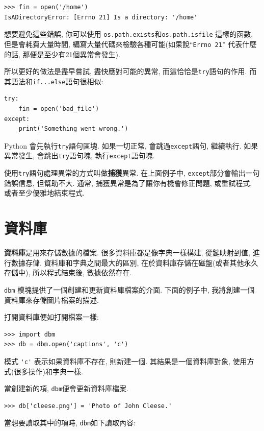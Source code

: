 \documentclass[10pt]{book}
\begin{document}
\begin{verbatim}
>>> fin = open('/home')
IsADirectoryError: [Errno 21] Is a directory: '/home'
\end{verbatim}
%
想要避免這些錯誤, 你可以使用 {\tt os.path.exists}和{\tt os.path.isfile} 這樣的函數, 
但是會耗費大量時間, 編寫大量代碼來檢驗各種可能(如果說``{\tt Errno 21}'' 代表什麼的話, 
那便是至少有21個異常會發生). 


所以更好的做法是盡早嘗試, 盡快應對可能的異常, 而這恰恰是{\tt try}語句的作用. 
而其語法和{\tt if...else}語句很相似:

\begin{verbatim}
try:    
    fin = open('bad_file')
except:
    print('Something went wrong.')
\end{verbatim}
%
Python 會先執行{\tt try}語句區塊. 
如果一切正常, 會跳過{\tt except}語句, 繼續執行. 
如果異常發生, 會跳出{\tt try}語句塊, 執行{\tt except}語句塊. 

使用{\tt try}語句處理異常的方式叫做{\bf 捕獲}異常. 
在上面例子中, {\tt except}部分會輸出一句錯誤信息, 但幫助不大. 
通常, 捕獲異常是為了讓你有機會修正問題, 或重試程式, 或者至少優雅地結束程式. 


\section{資料庫}

{\bf 資料庫}是用來存儲數據的檔案. 
很多資料庫都是像字典一樣構建, 從鍵映射到值, 進行數據存儲. 
資料庫和字典之間最大的區別, 在於資料庫存儲在磁盤(或者其他永久存儲中), 
所以程式結束後, 數據依然存在. 
 

 {\tt dbm} 模塊提供了一個創建和更新資料庫檔案的介面. 
下面的例子中, 我將創建一個資料庫來存儲圖片檔案的描述. 

打開資料庫便如打開檔案一樣:

\begin{verbatim}
>>> import dbm
>>> db = dbm.open('captions', 'c')
\end{verbatim}
%

模式 \verb"'c'" 表示如果資料庫不存在, 則新建一個. 
其結果是一個資料庫對象, 使用方式(很多操作)和字典一樣.

當創建新的項, {\tt dbm}便會更新資料庫檔案.

\begin{verbatim}
>>> db['cleese.png'] = 'Photo of John Cleese.'
\end{verbatim}
%
當想要讀取其中的項時,  {\tt dbm}如下讀取內容:
\end{document}
